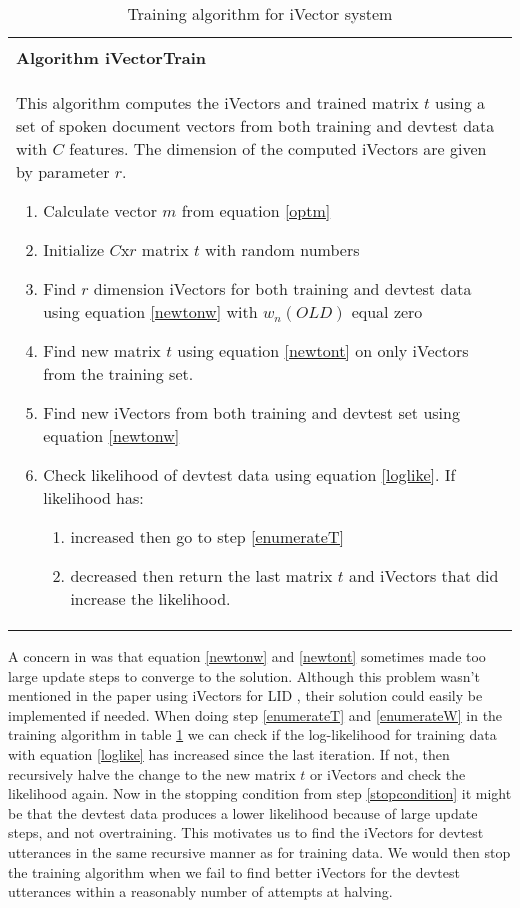 \begin{table}
\begin{tabular}{ | p{12cm} | }
\hline
\\
\textbf{Algorithm iVectorTrain}
\\
This algorithm computes the iVectors and trained matrix $t$ using a set of spoken document vectors from both training and devtest data with $C$ features. The dimension of the computed iVectors are given by parameter $r$.
\begin{enumerate}
  \item Calculate vector $m$ from equation \ref{optm} 
  \item Initialize $C$x$r$ matrix $t$ with random numbers
  \item Find $r$ dimension iVectors for both training and devtest data using equation \ref{newtonw} with $w_n(OLD)$ equal zero  
  \item \label{enumerateT} Find new matrix $t$ using equation \ref{newtont} on only iVectors from the training set.
  \item \label{enumerateW} Find new iVectors from both training and devtest set using equation \ref{newtonw}
  \item \label{stopcondition} Check likelihood of devtest data using equation \ref{loglike}. If likelihood has:
  \begin{enumerate}
    \item increased then go to step \ref{enumerateT}
    \item decreased then return the last matrix $t$ and iVectors that did increase the likelihood.
  \end{enumerate}
\end{enumerate}
\\
\hline
\end{tabular}
\caption{Training algorithm for iVector system}
\label{algtrain}
\end{table}

A concern in \cite{sviVector} was that equation \ref{newtonw} and \ref{newtont} sometimes made too large update steps to converge to the solution. Although this problem wasn't mentioned in the paper using iVectors for LID \cite{liiVector}, their solution could easily be implemented if needed. When doing step \ref{enumerateT} and \ref{enumerateW} in the training algorithm in table \ref{algtrain} we can check if the log-likelihood for training data with equation \ref{loglike} has increased since the last iteration. If not, then recursively halve the change to the new matrix $t$ or iVectors and check the likelihood again. Now in the stopping condition from step \ref{stopcondition} it might be that the devtest data produces a lower likelihood because of large update steps, and not overtraining. This motivates us to find the iVectors for devtest utterances in the same recursive manner as for training data. We would then stop the training algorithm when we fail to find better iVectors for the devtest utterances within a reasonably number of attempts at halving.

